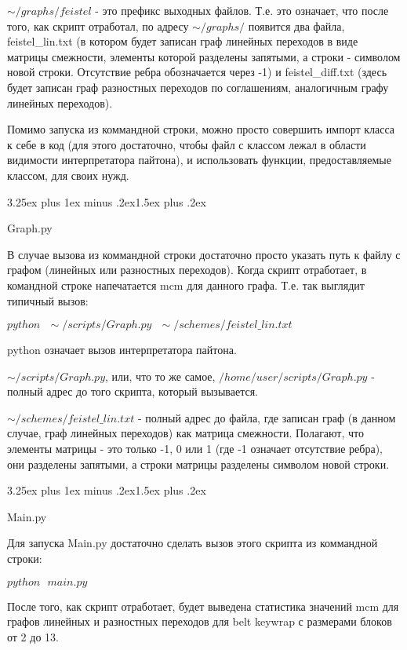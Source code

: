 \documentclass[a4paper,12pt]{report}
\makeatletter
\theoremstyle{plain} %
\theoremstyle{definition}
\theoremstyle{remark}
\renewcommand{\subsection}{\@startsection{subsection}{2}{18pt}%
{3.25ex plus 1ex minus .2ex}{1.5ex plus .2ex}%
{\normalfont\large\bfseries\raggedright}}%
\makeatother
\begin{document}
\begin{large}
$\sim/graphs/feistel$ - это префикс выходных файлов. Т.е. это означает, что после того, как скрипт отработал, по адресу $\sim/graphs/$ появится два файла, feistel\_lin.txt (в котором будет записан граф линейных переходов в виде матрицы смежности, элементы которой разделены запятыми, а строки - символом новой строки. Отсутствие ребра обозначается через -1) и feistel\_diff.txt (здесь будет записан  граф разностных переходов по соглашениям, аналогичным графу линейных переходов).

Помимо запуска из коммандной строки, можно просто совершить импорт класса к себе в код (для этого достаточно, чтобы файл с классом лежал в области видимости интерпретатора пайтона), и использовать функции, предоставляемые классом, для своих нужд.

\subsection{Graph.py}

В случае вызова из коммандной строки достаточно просто указать путь к файлу с графом (линейных или разностных переходов). Когда скрипт отработает, в командной строке напечатается mcm для данного графа. Т.е. так выглядит типичный вызов:

$python ~~~\sim/scripts/Graph.py~~~ \sim/schemes/feistel\_lin.txt$

python означает вызов интерпретатора пайтона.

$\sim/scripts/Graph.py$, или, что то же самое, $/home/user/scripts/Graph.py$ - полный адрес до того скрипта, который вызывается.

$\sim/schemes/feistel\_lin.txt$ - полный адрес до файла, где записан граф (в данном случае, граф линейных переходов) как матрица смежности. Полагают, что элементы матрицы - это только -1, 0 или 1 (где -1 означает отсутствие ребра), они разделены запятыми, а строки матрицы разделены символом новой строки.

\subsection{Main.py}

Для запуска Main.py достаточно сделать вызов этого скрипта из коммандной строки:

 $python ~~~ main.py$

После того, как скрипт отработает, будет выведена статистика значений mcm для графов линейных и разностных переходов для belt keywrap с размерами блоков от 2 до 13.


\end{large}
\end{document}
